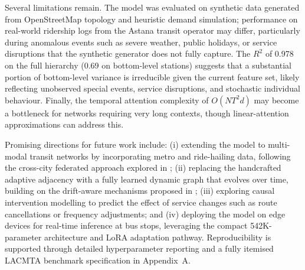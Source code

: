 Several limitations remain. The model was evaluated on synthetic data generated from OpenStreetMap topology and heuristic demand simulation; performance on real-world ridership logs from the Astana transit operator may differ, particularly during anomalous events such as severe weather, public holidays, or service disruptions that the synthetic generator does not fully capture. The $R^2$ of 0.978 on the full hierarchy (0.69 on bottom-level stations) suggests that a substantial portion of bottom-level variance is irreducible given the current feature set, likely reflecting unobserved special events, service disruptions, and stochastic individual behaviour. Finally, the temporal attention complexity of $O(N T^2 d)$ may become a bottleneck for networks requiring very long contexts, though linear-attention approximations can address this.

Promising directions for future work include: (i) extending the model to multi-modal transit networks by incorporating metro and ride-hailing data, following the cross-city federated approach explored in \cite{sakhipov2026deep}; (ii) replacing the handcrafted adaptive adjacency with a fully learned dynamic graph that evolves over time, building on the drift-aware mechanisms proposed in \cite{sakhipov2025federated}; (iii) exploring causal intervention modelling to predict the effect of service changes such as route cancellations or frequency adjustments; and (iv) deploying the model on edge devices for real-time inference at bus stops, leveraging the compact 542K-parameter architecture and LoRA adaptation pathway. Reproducibility is supported through detailed hyperparameter reporting and a fully itemised LACMTA benchmark specification in Appendix~A.